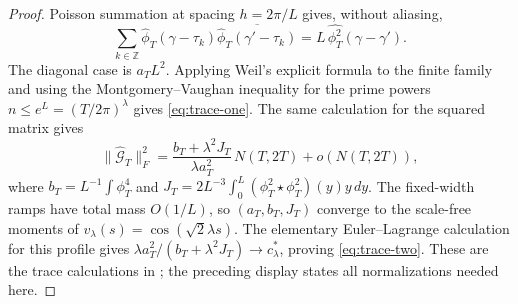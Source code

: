 \documentclass[11pt,reqno]{amsart}
\theoremstyle{definition}
\theoremstyle{remark}
\begin{document}
\begin{proof}
Poisson summation at spacing $h=2\pi/L$ gives, without aliasing,
\[
 \sum_{k\in\mathbb Z}
 \widehat\phi_T(\gamma-\tau_k)
 \overline{\widehat\phi_T(\gamma'-\tau_k)}
 =L\,\widehat{\phi_T^2}(\gamma-\gamma').
\]
The diagonal case is $a_TL^2$.  Applying Weil's explicit formula to the
finite family and using the Montgomery--Vaughan inequality for the prime
powers $n\le e^L=(T/2\pi)^\lambda$ gives
\eqref{eq:trace-one}.  The same calculation for the squared matrix gives
\[
 \|\widehat{\mathcal G}_T\|_F^2
 =\frac{b_T+\lambda^2J_T}{\lambda a_T^2}\,N(T,2T)+o(N(T,2T)),
\]
where $b_T=L^{-1}\int\phi_T^4$ and
$J_T=2L^{-3}\int_0^L(\phi_T^2\star\phi_T^2)(y)y\,dy$.
The fixed-width ramps have total mass $O(1/L)$, so
$(a_T,b_T,J_T)$ converge to the scale-free moments of
$v_\lambda(s)=\cos(\sqrt2\lambda s)$.  The elementary Euler--Lagrange
calculation for this profile gives
$\lambda a_T^2/(b_T+\lambda^2J_T)\to c_\lambda^*$, proving
\eqref{eq:trace-two}.  These are the trace calculations in
\cite[Sections~2, 5 and 7.1]{Claude2026}; the preceding display states all
normalizations needed here.


\end{proof}
\end{document}
